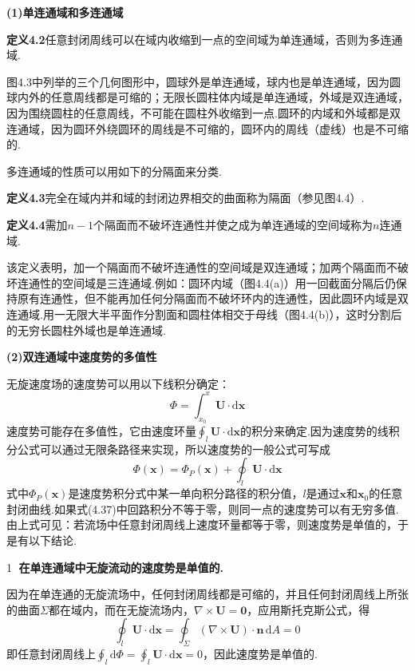 \textbf{(1)单连通域和多连通域}

\noindent\textbf{定义4.2}\quad 任意封闭周线可以在域内收缩到一点的空间域为单连通域，否则为多连通域.

图4.3中列举的三个几何图形中，圆球外是单连通域，球内也是单连通域，因为圆球内外的任意周线都是可缩的；无限长圆柱体内域是单连通域，外域是双连通域，因为围绕圆柱的任意周线，不可能在圆柱外收缩到一点.圆环的内域和外域都是双连通域，因为圆环外绕圆环的周线是不可缩的，圆环内的周线（虚线）也是不可缩的.

多连通域的性质可以用如下的分隔面来分类.

\noindent\textbf{定义4.3}\quad 完全在域内并和域的封闭边界相交的曲面称为隔面（参见图4.4）.

\noindent\textbf{定义4.4}\quad 需加$n-1$个隔面而不破坏连通性并使之成为单连通域的空间域称为$n$连通域.

该定义表明，加一个隔面而不破坏连通性的空间域是双连通域；加两个隔面而不破坏连通性的空间域是三连通域.例如：圆环内域（图4.4(a)）用一回截面分隔后仍保持原有连通性，但不能再加任何分隔面而不破坏环内的连通性，因此圆环内域是双连通域.用一无限大半平面作分割面和圆柱体相交于母线（图4.4(b)），这时分割后的无穷长圆柱外域也是单连通域.

\textbf{(2)双连通域中速度势的多值性}

无旋速度场的速度势可以用以下线积分确定：
\[
\Phi=\int_{x_0}^{x}\boldsymbol{U}\cdot\mathrm{d}\boldsymbol{x}
\]
速度势可能存在多值性，它由速度环量$\displaystyle\oint_l\boldsymbol{U}\cdot\mathrm{d}\boldsymbol{x}$的积分来确定.因为速度势的线积分公式可以通过无限条路径来实现，所以速度势的一般公式可写成
\begin{equation*}
\Phi(\boldsymbol{x})=\Phi_P(\boldsymbol{x})+\oint_l\boldsymbol{U}\cdot\mathrm{d}\boldsymbol{x}
\tag{4.37}
\end{equation*}
式中$\Phi_P(\boldsymbol{x})$是速度势积分式中某一单向积分路径的积分值，$l$是通过$\boldsymbol{x}$和$\boldsymbol{x}_0$的任意封闭曲线.如果式(4.37)中回路积分不等于零，则同一点的速度势可以有无穷多值.由上式可见：若流场中任意封闭周线上速度环量都等于零，则速度势是单值的，于是有以下结论.

\textcircled{1} \textbf{在单连通域中无旋流动的速度势是单值的.}

因为在单连通的无旋流场中，任何封闭周线都是可缩的，并且任何封闭周线上所张的曲面$\Sigma$都在域内，而在无旋流场内，$\nabla\times\boldsymbol{U}=\boldsymbol{0}$，应用斯托克斯公式，得
\[
\oint_l\boldsymbol{U}\cdot\mathrm{d}\boldsymbol{x}=\oint_\Sigma(\nabla\times\boldsymbol{U})\cdot\boldsymbol{n}\,\mathrm{d}A=0
\]
即任意封闭周线上$\displaystyle\oint_l\mathrm{d}\Phi=\oint_l\boldsymbol{U}\cdot\mathrm{d}\boldsymbol{x}=0$，因此速度势是单值的.

